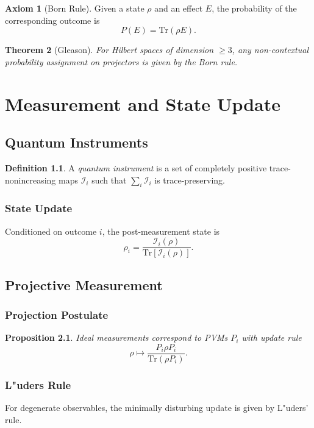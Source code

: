 \documentclass[12pt]{book}
\theoremstyle{plain}
\newtheorem{theorem}{Theorem}[chapter]
\newtheorem{proposition}[theorem]{Proposition}
\theoremstyle{definition}
\newtheorem{definition}[theorem]{Definition}
\newtheorem{axiom}[theorem]{Axiom}
\theoremstyle{remark}
\begin{document}
\begin{axiom}[Born Rule]
Given a state $\rho$ and an effect $E$, the probability of the corresponding outcome is
\[
P(E) = \mathrm{Tr}(\rho E).
\]
\end{axiom}

\begin{theorem}[Gleason]
For Hilbert spaces of dimension $\ge 3$, any non-contextual probability assignment on projectors is given by the Born rule.
\end{theorem}

\part{Measurement and State Update}

\chapter{Quantum Instruments}

\begin{definition}
A \emph{quantum instrument} is a set of completely positive trace-nonincreasing maps ${\mathcal{I}_i}$ such that $\sum_i \mathcal{I}_i$ is trace-preserving.
\end{definition}

\section{State Update}
Conditioned on outcome $i$, the post-measurement state is
\[
\rho_i = \frac{\mathcal{I}_i(\rho)}{\mathrm{Tr}[\mathcal{I}_i(\rho)]}.
\]

\chapter{Projective Measurement}

\section{Projection Postulate}

\begin{proposition}
Ideal measurements correspond to PVMs ${P_i}$ with update rule
\[
\rho \mapsto \frac{P_i \rho P_i}{\mathrm{Tr}(\rho P_i)}.
\]
\end{proposition}

\section{L"uders Rule}
For degenerate observables, the minimally disturbing update is given by L"uders' rule.
\end{document}
